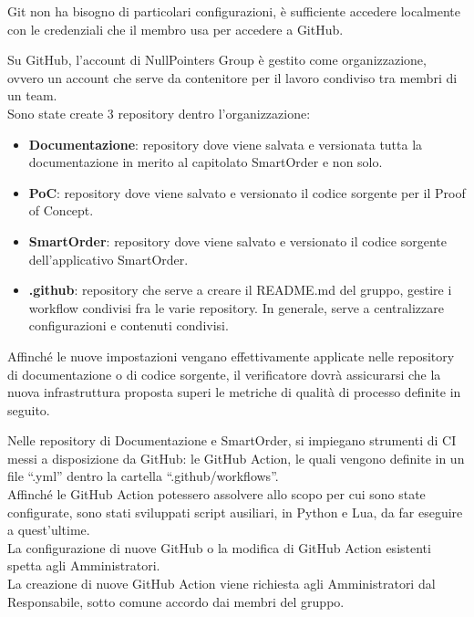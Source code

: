 Git non ha bisogno di particolari configurazioni, è sufficiente accedere localmente con le credenziali che il membro usa per accedere a GitHub.

Su GitHub, l’account di NullPointers Group è gestito come organizzazione, ovvero un account che serve da contenitore per il lavoro condiviso tra membri di un team.\\
Sono state create 3 repository dentro l’organizzazione:
\begin{itemize}[itemsep=3pt, parsep=1pt, label=$\scriptstyle\bullet$]
    \item \textbf{Documentazione}: repository dove viene salvata e versionata tutta la documentazione in merito al capitolato SmartOrder e non solo.
    \item \textbf{PoC}: repository dove viene salvato e versionato il codice sorgente per il Proof of Concept.
    \item \textbf{SmartOrder}: repository dove viene salvato e versionato il codice sorgente dell’applicativo SmartOrder.
    \item \textbf{.github}: repository che serve a creare il README.md del gruppo, gestire i workflow condivisi fra le varie repository. In generale, serve a centralizzare configurazioni e contenuti condivisi.
\end{itemize}
Affinché le nuove impostazioni vengano effettivamente applicate nelle repository di documentazione o di codice sorgente, il verificatore dovrà assicurarsi che la nuova infrastruttura proposta superi le metriche di qualità di processo definite in seguito.

Nelle repository di Documentazione e SmartOrder, si impiegano strumenti di CI messi a disposizione da GitHub: le GitHub Action, le quali vengono definite in un file “.yml” dentro la cartella “.github/workflows”.\\
Affinché le GitHub Action potessero assolvere allo scopo per cui sono state configurate, sono stati sviluppati script ausiliari, in Python e Lua, da far eseguire a quest'ultime.\\
La configurazione di nuove GitHub o la modifica di GitHub Action esistenti spetta agli Amministratori.\\
La creazione di nuove GitHub Action viene richiesta agli Amministratori dal Responsabile, sotto comune accordo dai membri del gruppo.\\

